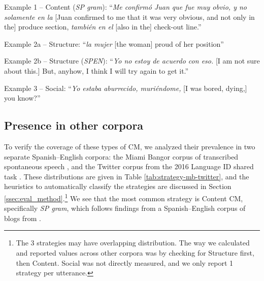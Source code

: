 \documentclass[11pt,a4paper]{article}
\newcommand{\ea}[1]{\textcolor{blue}{\bf\small [#1 --EA]}}
\newenvironment{itemizesquish}{\begin{list}{\labelitemi}{\setlength{\itemsep}{-0.25em}\setlength{\labelwidth}{0.5em}\setlength
{\leftmargin}{\labelwidth}\addtolength{\leftmargin}{\labelsep}}}{\end{list}}
\begin{document}
\begin{itemizesquish}
\item Example 1 -- Content (\textit{SP gram}): ``\textit{Me confirm\'o Juan que fue muy obvio, y no solamente en la} [Juan confirmed to me that it was very obvious, and not only in the] produce section, \textit{tambi\'en en el} [also in the] check-out line.'' \cite{Solorio2008}
\item Example 2a -- Structure: ``\textit{la mujer} [the woman] proud of her position'' \cite{Belazi1994}
\item Example 2b -- Structure (\textit{SP\textrightarrow EN}): ``\textit{Yo no estoy de acuerdo con eso.} [I am not sure about this.] But, anyhow, I think I will try again to get it.'' \cite{Ardila2005}
\item Example 3 -- Social: ``\textit{Yo estaba aburrecido, muri\'endome,} [I was bored, dying,] you know?'' \cite{sankoff1981formal}
\end{itemizesquish}

\subsection{Presence in other corpora}
\label{ssec:miami-twitter}

To verify the coverage of these types of CM, we analyzed their prevalence in two separate Spanish--English corpora: the Miami Bangor corpus of transcribed spontaneous speech \citep{deuchar2014building}, and the Twitter corpus from the 2016 Language ID shared task \citep{Molina2016}. 
These distributions are given in Table \ref{tab:strategy-mb-twitter}, and the heuristics to automatically classify the strategies are discussed in Section \ref{ssec:eval_method}.\footnote{The 3 strategies may have overlapping distribution. 
The way we calculated and reported values across other corpora was by checking for Structure first, then Content. 
Social was not directly measured, and we only report 1 strategy per utterance.} 
We see that the most common strategy is Content CM, specifically \textit{SP gram}, which follows findings from a Spanish--English corpus of blogs from \citet{Montes-Alcala2007}.
\end{document}
